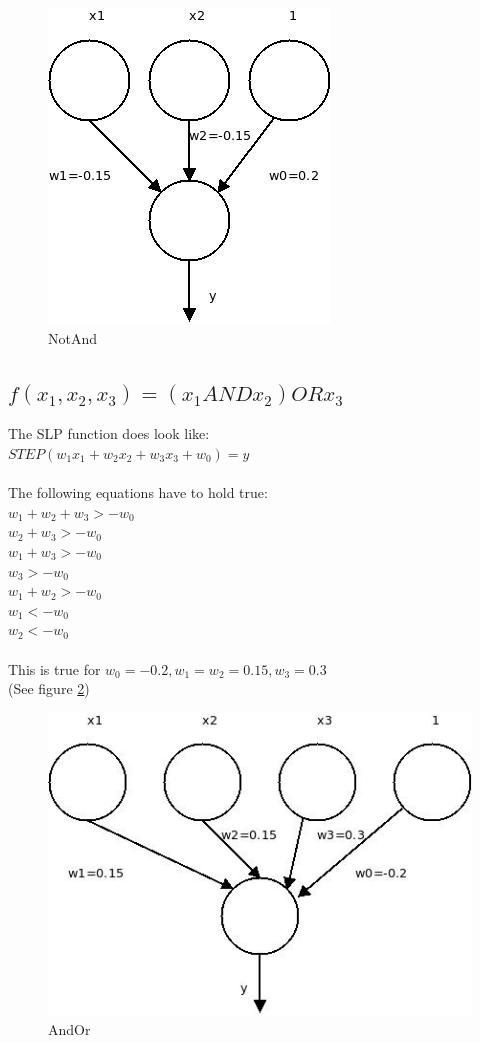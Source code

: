 \documentclass[paper=a4, fontsize=11pt]{scrartcl} %
\numberwithin{equation}{section} %
\numberwithin{figure}{section} %
\numberwithin{table}{section} %
\begin{document}
\begin{figure}[ht]
	\centering
  \includegraphics[width=0.5\textheight]{NotAnd.jpeg}
	\caption{NotAnd}
	\label{figNotAnd}
\end{figure}

\subsection{$f(x_1 , x_2 , x_3 ) = (x_1 AND x_2 ) OR x_3$}

The SLP function does look like:\\
$STEP(w_1x_1 + w_2x_2 + w_3x_3 + w_0) = y$\\\\
The following equations have to hold true:\\
$w_1 + w_2 + w_3 > -w_0$\\
$w_2 + w_3 > -w_0$\\
$w_1 + w_3 > -w_0$\\
$w_3 > -w_0$\\
$w_1 + w_2 > -w_0$\\
$w_1 < -w_0$\\
$w_2 < -w_0$\\\\

This is true for $w_0 = -0.2, w_1 = w_2 = 0.15, w_3 = 0.3$\\
(See figure \ref{figAndOr})

\begin{figure}[ht]
	\centering
  \includegraphics[width=0.5\textheight]{AndOr.jpeg}
	\caption{AndOr}
	\label{figAndOr}
\end{figure}
\end{document}
